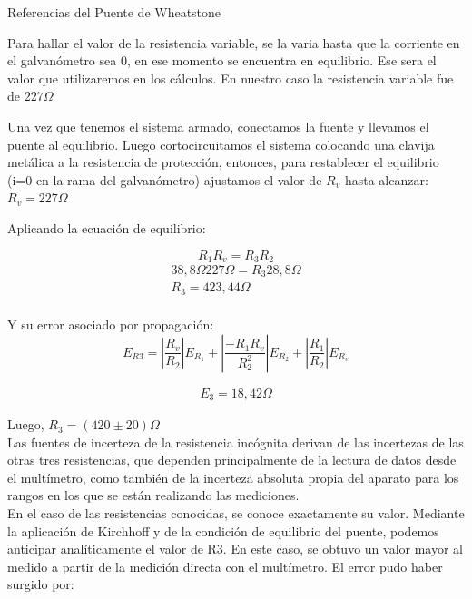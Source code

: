 \documentclass{article}
\begin{document}
\begin{table}[ht]
\centering

\caption{Referencias  del Puente de Wheatstone}
\end{table}

Para hallar el valor de la resistencia variable, se la varia hasta que la corriente en el galvanómetro sea 0, en ese momento se encuentra en equilibrio. Ese sera el valor que utilizaremos en los cálculos. En nuestro caso la resistencia variable fue de $227 \Omega$
    
Una vez que tenemos el sistema armado, conectamos la fuente y llevamos el puente al equilibrio. Luego cortocircuitamos el sistema colocando una clavija metálica a la resistencia de protección, entonces, para restablecer el equilibrio (i=0 en la rama del galvanómetro)
ajustamos el valor de $R_v$ hasta alcanzar:
$R_v = 227\Omega$

Aplicando la ecuación de equilibrio:

\begin{equation}
R_1 R_v = R_3 R_2
\end{equation}
\begin{align*}
38,8\Omega 227\Omega = R_3 28,8\Omega \\
R_3 = 423,44 \Omega \\
\end{align*}

Y su error asociado por propagación:
\begin{equation}
E_{R3} = \left| \frac{R_v}{R_2} \right| E_{R_1} + 
\left| \frac{-R_1 R_v}{R_{2}^2}\right| E_{R_2} + \left| \frac{R_1}{R_2} \right| E_{R_v}
\end{equation}

\begin{align*}
E_3 = 18,42 \Omega
\end{align*} 

Luego, $R_3 = (420 \pm 20)\Omega$\\



Las fuentes de incerteza de la resistencia incógnita derivan de las incertezas de las otras tres resistencias, que dependen principalmente de la lectura de datos desde el multímetro, como también de la incerteza absoluta propia del aparato para los rangos en los que se están realizando las mediciones.\\
En el caso de las resistencias conocidas, se conoce exactamente su valor. Mediante la aplicación de Kirchhoff y de la condición de equilibrio del puente, podemos anticipar analíticamente el valor de R3. En este caso, se obtuvo un valor mayor al medido a partir de la medición directa con el multímetro. El error pudo haber surgido por:
\end{document}
